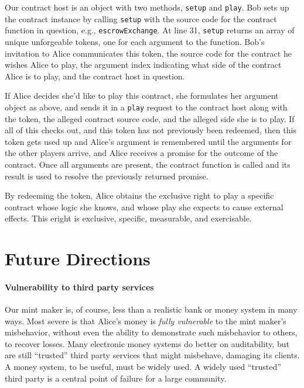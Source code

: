 \documentclass{llncs}
\begin{document}
Our contract host is an object with two methods, {\tt setup} and {\tt play}. Bob sets up the contract instance by calling {\tt setup} with the source code for the contract function in question, e.g., {\tt escrowExchange}. At line 31, {\tt setup} returns an array of unique unforgeable tokens, one for each argument to the function. Bob's invitation to Alice communicates this token, the source code for the contract he wishes Alice to play, the argument index indicating what side of the contract Alice is to play, and the contract host in question.

If Alice decides she'd like to play this contract, she formulates her argument object as above, and sends it in a {\tt play} request to the contract host along with the token, the alleged contract source code, and the alleged side she is to play. If all of this checks out, and this token has not previously been redeemed, then this token gets used up and Alice's argument is remembered until the arguments for the other players arrive, and Alice receives a promise for the outcome of the contract. Once all arguments are present, the contract function is called and its result is used to resolve the previously returned promise.

By redeeming the token, Alice obtains the exclusive right to play a specific contract whose logic she knows, and whose play she expects to cause external effects. This eright is exclusive, specific, measurable, and exercisable. 

\section{Future Directions}
\label{futureDirections}

\paragraph{Vulnerability to third party services}

Our mint maker is, of course, less than a realistic bank or money system in many ways. Most severe is that Alice's money is \emph{fully vulnerable} to the mint maker's misbehavior, without even the ability to demonstrate such misbehavior to others, to recover losses. Many electronic money systems do better on auditability, but are still ``trusted'' third party services that might misbehave, damaging its clients. A money system, to be useful, must be widely used. A widely used ``trusted'' third party is a central point of failure for a large community.
\end{document}
